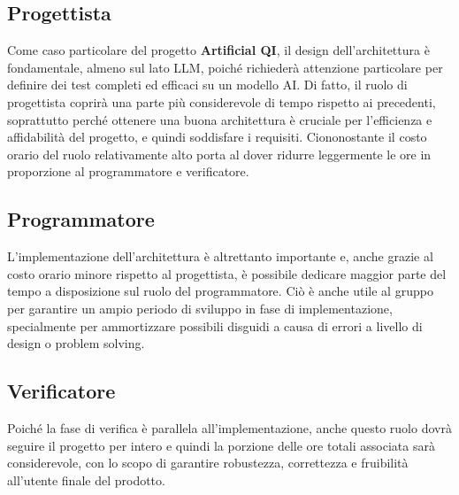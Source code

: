\documentclass[10pt]{article}
\begin{document}
    \subsection{Progettista}
    Come caso particolare del progetto \textbf{Artificial QI}, il design dell'architettura è fondamentale,
    almeno sul lato LLM, poiché richiederà attenzione particolare per definire dei test completi ed efficaci
    su un modello AI. Di fatto, il ruolo di progettista coprirà una parte più considerevole di tempo rispetto
    ai precedenti, soprattutto perché ottenere una buona architettura è cruciale per l'efficienza e affidabilità del progetto,
    e quindi soddisfare i requisiti. Ciononostante il costo orario del ruolo relativamente alto porta al dover ridurre leggermente le ore
    in proporzione al programmatore e verificatore.

    \subsection{Programmatore}
    L'implementazione dell'architettura è altrettanto importante e, anche grazie al costo orario minore rispetto al progettista, è possibile
    dedicare maggior parte del tempo a disposizione sul ruolo del programmatore. Ciò è anche utile al gruppo per garantire un ampio periodo di
    sviluppo in fase di implementazione, specialmente per ammortizzare possibili disguidi a causa di errori a livello di design o problem solving.

    \subsection{Verificatore}
    Poiché la fase di verifica è parallela all'implementazione, anche questo ruolo dovrà seguire il progetto per intero e quindi
    la porzione delle ore totali associata sarà considerevole, con lo scopo di garantire robustezza, correttezza e fruibilità all'utente finale
    del prodotto.

    \newpage
\end{document}
